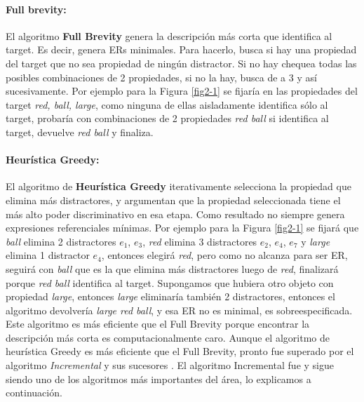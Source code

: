  


\paragraph{Full brevity:} El algoritmo {\bf Full Brevity} \cite{Dale:1989:CUR:981623.981632} genera la descripci\'on m\'as corta que 
identifica al target. Es decir, genera ERs minimales. Para hacerlo, 
busca si hay una propiedad del target que no sea propiedad de ning\'un distractor. Si no hay chequea todas las posibles combinaciones 
de 2 propiedades, si no la hay, busca de a 3 y as\'i sucesivamente. Por ejemplo para la Figura \ref{fig2-1} se fijar\'ia en las propiedades 
del target {\it red, ball, large}, como ninguna de ellas aisladamente identifica s\'olo al target, probar\'ia con combinaciones de 2 propiedades {\it red ball} si identifica al target, devuelve {\it red ball} y finaliza.

\paragraph{Heur\'istica Greedy:} El algoritmo de {\bf Heur\'istica Greedy} \cite{greedy} iterativamente selecciona la propiedad que elimina m\'as distractores, y argumentan que la propiedad seleccionada tiene el m\'as alto poder discriminativo en esa etapa. Como resultado 
no siempre genera expresiones referenciales m\'inimas. Por ejemplo para la Figura \ref{fig2-1} se fijar\'a que {\it ball} elimina 2 distractores {$e_{1}$, $e_{3}$}, 
{\it red} elimina 3 distractores {$e_{2}$, $e_{4}$, $e_{7}$} y {\it large} elimina 1 distractor {$e_{4}$}, entonces elegir\'a {\it red}, 
pero como no alcanza para ser ER, seguir\'a con {\it ball} que es la que elimina m\'as distractores luego de {\it red}, finalizar\'a porque 
{\it red ball} identifica al target. Supongamos que hubiera otro objeto con propiedad {\it large}, entonces {\it large} eliminar\'ia tambi\'en  
 2 distractores, entonces el algoritmo devolver\'ia {\it large red ball}, y esa ER no es minimal, es sobreespecificada.
Este algoritmo es m\'as eficiente que el Full Brevity porque encontrar la descripci\'on m\'as corta es computacionalmente caro. Aunque el 
algoritmo de heur\'istica Greedy es m\'as eficiente que el Full Brevity, pronto fue superado por el algoritmo {\it Incremental} 
y sus sucesores \cite{C92-1038,incremental}. El algoritmo Incremental fue y sigue siendo uno de los algoritmos 
m\'as importantes del \'area, lo explicamos a continuaci\'on. 

